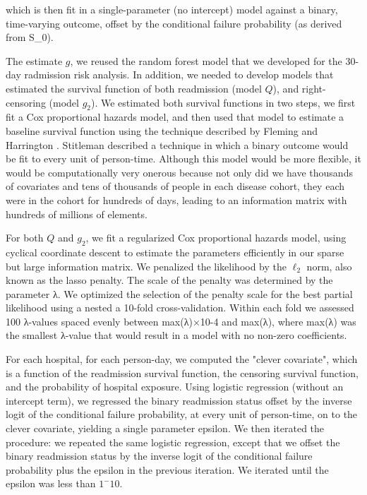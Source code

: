 \documentclass[]{article}\usepackage[]{graphicx}\usepackage[]{color}
\begin{document}
which is then fit in a single-parameter (no intercept) model against a binary, time-varying outcome, offset by the conditional failure probability (as derived from S_0).

The estimate $g$, we reused the random forest model that we developed for the 30-day radmission risk analysis. In addition, we needed to develop models that estimated the survival function of both readmission (model $Q$), and right-censoring (model $g_2$). We estimated both survival functions in two steps, we first fit a Cox proportional hazards model, and then used that model to estimate a baseline survival function using the technique described by Fleming and Harrington \supercite{fleming_nonparametric_1984}. Stitleman described a technique in which a binary outcome would be fit to every unit of person-time. Although this model would be more flexible, it would be computationally very onerous because not only did we have thousands of covariates and tens of thousands of people in each disease cohort, they each were in the cohort for hundreds of days, leading to an information matrix with hundreds of millions of elements.

For both $Q$ and $g_2$, we fit a regularized Cox proportional hazards model, using cyclical coordinate descent to estimate the parameters efficiently in our sparse but large information matrix. We penalized the likelihood by the $\ell_2$ norm, also known as the lasso penalty. The scale of the penalty was determined by the parameter λ. We optimized the selection of the penalty scale for the best partial likelihood using a nested a 10-fold cross-validation. Within each fold we assessed 100 λ-values spaced evenly between max(λ)×10-4 and max(λ), where max(λ) was the smallest λ-value that would result in a model with no non-zero coefficients.

For each hospital, for each person-day, we computed the "clever covariate", which is a function of the readmission survival function, the censoring survival function, and the probability of hospital exposure. Using logistic regression (without an intercept term), we regressed the binary readmission status offset by the inverse logit of the conditional failure probability, at every unit of person-time, on to the clever covariate, yielding a single parameter epsilon. We then iterated the procedure: we repeated the same logistic regression, except that we offset the binary readmission status by the inverse logit of the conditional failure probability plus the epsilon in the previous iteration. We iterated until the epsilon was less than $1^-10$.
\end{document}
